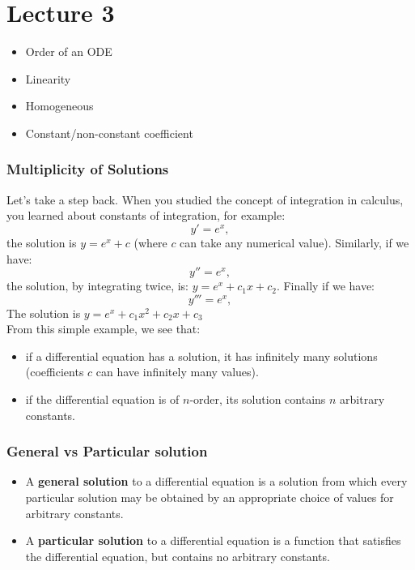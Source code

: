 \chapter*{Lecture 3}
\begin{recall}{}{}
\begin{itemize}
\item Order of an ODE
\item Linearity
\item Homogeneous
\item Constant/non-constant coefficient
\end{itemize}
\end{recall}

\subsection{Multiplicity of Solutions}
Let's take a step back. When you studied the concept of integration in calculus, you learned about constants of integration, for example:
\begin{equation*}
y'=e^x,
\end{equation*}
the solution is $y=e^x+c$ (where $c$ can take any numerical value). Similarly, if we have:
\begin{equation*}
y''=e^x,
\end{equation*}
the solution, by integrating twice, is: $y=e^x+c_1x+c_2$. Finally if we have:
\begin{equation*}
y'''=e^x,
\end{equation*}
The solution is $y=e^x+c_1x^2+c_2x+c_3$\\
From this simple example, we see that:
\begin{itemize}
\item if a differential equation has a solution, it has infinitely many solutions (coefficients $c$ can have infinitely many values).
\item if the differential equation is of  $n$-order, its solution contains $n$ arbitrary constants.
\end{itemize}

\subsection{General vs Particular solution}
\begin{itemize}
\item  A \textbf{general solution} to a differential equation is a solution from which every particular solution may be obtained by an appropriate choice of values for arbitrary constants.
\item A \textbf{particular solution} to a differential equation is a function that satisfies the differential equation, but contains no arbitrary constants.
\end{itemize}





